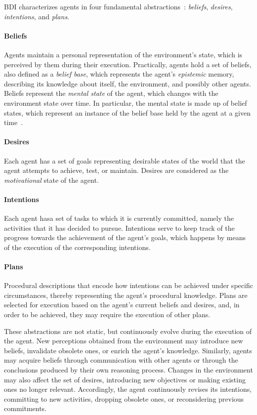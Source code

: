\ac{BDI} characterizes agents in four fundamental abstractions~\cite{rao1991bdi}: 
\emph{beliefs}, \emph{desires}, \emph{intentions}, and \emph{plans}.

\paragraph{Beliefs}
Agents maintain a personal representation of the environment's state,
which is perceived by them during their execution.
%
Practically,
agents hold a set of beliefs,
also defined as a \emph{belief base},
which represents the agent's
\emph{epistemic} memory,
describing its knowledge about itself,
the environment,
and possibly other agents.
%
Beliefs represent the \emph{mental state} of the agent, 
which changes with the environment state over time.
%
In particular,
the mental state is made up of belief states, 
which represent an instance of the belief base held by the agent at a given time~\cite{KinnyGR96}.


\paragraph{Desires}
Each agent has a set of goals representing desirable states of the world that the agent
attempts to achieve,
test,
or maintain.
%
Desires are considered as the \emph{motivational} state of the agent.

\paragraph{Intentions}
Each agent hasa set of tasks to which it is currently committed,
namely the activities that it has decided to pursue.
%
Intentions serve to keep track of the progress towards the achievement of the agent's goals,
which happens by means of the execution of the corresponding intentions.

\paragraph{Plans}
Procedural descriptions that encode how intentions can be achieved under
specific circumstances,
thereby representing the agent's procedural knowledge.
%
Plans are selected for execution based on the agent's current beliefs and desires,
and, in order to be achieved,
they may require the execution of other plans.

These abstractions are not static,
but continuously evolve during the execution of the agent.
%
New perceptions obtained from the environment may introduce new beliefs,
invalidate obsolete ones,
or enrich the agent's knowledge.
%
Similarly,
agents may acquire beliefs through communication with other agents
or through the conclusions produced by their own reasoning process.
%
Changes in the environment may also affect the set of desires,
introducing new objectives or making existing ones no longer relevant.
%
Accordingly,
the agent continuously revises its intentions,
committing to new activities,
dropping obsolete ones,
or reconsidering previous commitments.

